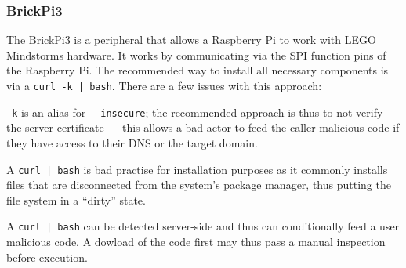 
\subsubsection{BrickPi3} \label{brickpi 3}
The BrickPi3 is a peripheral that allows a Raspberry Pi to work with LEGO Mindstorms hardware.
It works by communicating via the SPI function pins of the Raspberry Pi.
The recommended way to install all necessary components is via a \texttt{curl -k | bash}.
There are a few issues with this approach:
\begin{inline-enum}
\item \verb|-k| is an alias for \verb|--insecure|;
  the recommended approach is thus to not verify the server certificate ---
  this allows a bad actor to feed the caller malicious code if they have access to their DNS or the target domain.
\item A \texttt{curl | bash} is bad practise for installation purposes as it commonly installs files that are disconnected from the system's package manager,
  thus putting the file system in a ``dirty'' state.
\item A \texttt{curl | bash} can be detected server-side and thus can conditionally feed a user malicious code.
  A dowload of the code first may thus pass a manual inspection before execution. \parencite{curl-bash}
\end{inline-enum}

